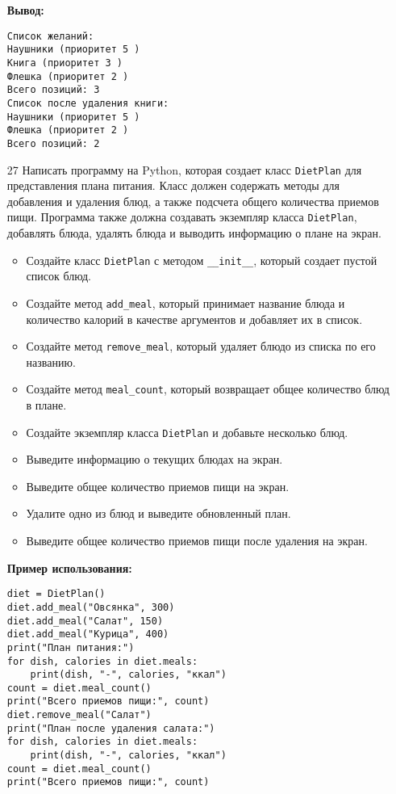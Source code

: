 \begin{enumerate}
\textbf{Вывод:}
\begin{verbatim}
Список желаний:
Наушники (приоритет 5 )
Книга (приоритет 3 )
Флешка (приоритет 2 )
Всего позиций: 3
Список после удаления книги:
Наушники (приоритет 5 )
Флешка (приоритет 2 )
Всего позиций: 2
\end{verbatim}

\item[27] Написать программу на Python, которая создает класс \texttt{DietPlan} для представления плана питания. Класс должен содержать методы для добавления и удаления блюд, а также подсчета общего количества приемов пищи. Программа также должна создавать экземпляр класса \texttt{DietPlan}, добавлять блюда, удалять блюда и выводить информацию о плане на экран.

\begin{itemize}
    \item Создайте класс \texttt{DietPlan} с методом \texttt{\_\_init\_\_}, который создает пустой список блюд.
    \item Создайте метод \texttt{add\_meal}, который принимает название блюда и количество калорий в качестве аргументов и добавляет их в список.
    \item Создайте метод \texttt{remove\_meal}, который удаляет блюдо из списка по его названию.
    \item Создайте метод \texttt{meal\_count}, который возвращает общее количество блюд в плане.
    \item Создайте экземпляр класса \texttt{DietPlan} и добавьте несколько блюд.
    \item Выведите информацию о текущих блюдах на экран.
    \item Выведите общее количество приемов пищи на экран.
    \item Удалите одно из блюд и выведите обновленный план.
    \item Выведите общее количество приемов пищи после удаления на экран.
\end{itemize}

\textbf{Пример использования:}

\begin{verbatim}
diet = DietPlan()
diet.add_meal("Овсянка", 300)
diet.add_meal("Салат", 150)
diet.add_meal("Курица", 400)
print("План питания:")
for dish, calories in diet.meals:
    print(dish, "-", calories, "ккал")
count = diet.meal_count()
print("Всего приемов пищи:", count)
diet.remove_meal("Салат")
print("План после удаления салата:")
for dish, calories in diet.meals:
    print(dish, "-", calories, "ккал")
count = diet.meal_count()
print("Всего приемов пищи:", count)
\end{verbatim}


\end{enumerate}
